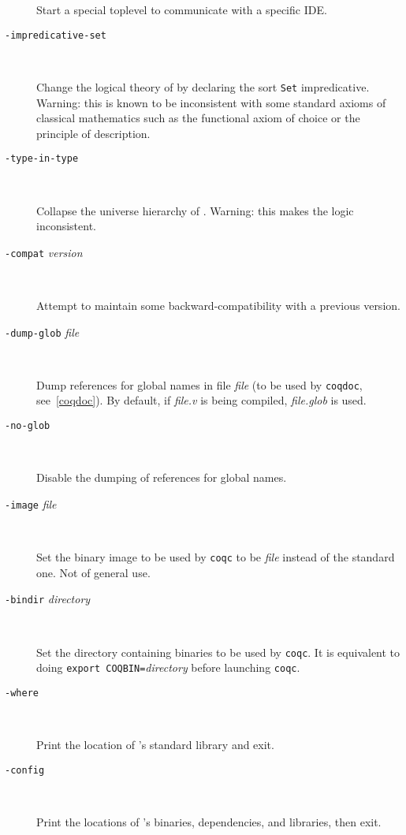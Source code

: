 \begin{description}
  Start a special toplevel to communicate with a specific IDE.

\item[{\tt -impredicative-set}]\ %

  Change the logical theory of {\Coq} by declaring the sort {\tt Set}
  impredicative. Warning: this is known to be inconsistent with
  some standard axioms of classical mathematics such as the functional
  axiom of choice or the principle of description.

\item[{\tt -type-in-type}]\ %

  Collapse the universe hierarchy of {\Coq}. Warning: this makes the
  logic inconsistent.

\item[{\tt -compat} {\em version}]\ %

  Attempt to maintain some backward-compatibility with a previous version.

\item[{\tt -dump-glob} {\em file}]\ %

  Dump references for global names in file {\em file} (to be used
  by {\tt coqdoc}, see~\ref{coqdoc}). By default, if {\em file.v} is being
  compiled, {\em file.glob} is used.

\item[{\tt -no-glob}]\ %

  Disable the dumping of references for global names.


\item[{\tt -image} {\em file}]\ %

  Set the binary image to be used by {\tt coqc} to be {\em file}
  instead of the standard one. Not of general use.

\item[{\tt -bindir} {\em directory}]\ %

  Set the directory containing {\Coq} binaries to be used by {\tt coqc}.
  It is equivalent to doing \texttt{export COQBIN=}{\em directory} before
  launching {\tt coqc}.

\item[{\tt -where}]\ %

  Print the location of \Coq's standard library and exit.

\item[{\tt -config}]\ %

  Print the locations of \Coq's binaries, dependencies, and libraries, then exit.


\end{description}
